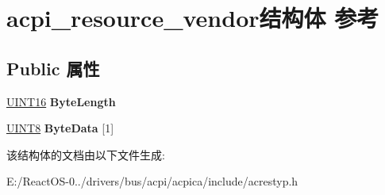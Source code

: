 \hypertarget{structacpi__resource__vendor}{}\section{acpi\+\_\+resource\+\_\+vendor结构体 参考}
\label{structacpi__resource__vendor}
\subsection*{Public 属性}
\begin{DoxyCompactItemize}
\item 
\mbox{\label{structacpi__resource__vendor_a999c0eb99ceb92687065279350e5651e}} 
\hyperlink{_processor_bind_8h_a09f1a1fb2293e33483cc8d44aefb1eb1}{U\+I\+N\+T16} {\bfseries Byte\+Length}
\item 
\mbox{\label{structacpi__resource__vendor_ab0f8f871952a6100dc53a14f2f540944}} 
\hyperlink{_processor_bind_8h_ab27e9918b538ce9d8ca692479b375b6a}{U\+I\+N\+T8} {\bfseries Byte\+Data} \mbox{[}1\mbox{]}
\end{DoxyCompactItemize}


该结构体的文档由以下文件生成\+:\begin{DoxyCompactItemize}
\item 
E\+:/\+React\+O\+S-\/0../drivers/bus/acpi/acpica/include/acrestyp.\+h\end{DoxyCompactItemize}
